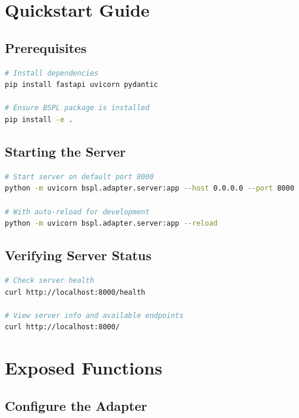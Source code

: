 \documentclass[11pt,a4paper]{article}
\begin{document}
\section{Quickstart Guide}

\subsection{Prerequisites}

\begin{lstlisting}[language=bash]
# Install dependencies
pip install fastapi uvicorn pydantic

# Ensure BSPL package is installed
pip install -e .
\end{lstlisting}

\subsection{Starting the Server}

\begin{lstlisting}[language=bash]
# Start server on default port 8000
python -m uvicorn bspl.adapter.server:app --host 0.0.0.0 --port 8000

# With auto-reload for development
python -m uvicorn bspl.adapter.server:app --reload
\end{lstlisting}

\subsection{Verifying Server Status}

\begin{lstlisting}[language=bash]
# Check server health
curl http://localhost:8000/health

# View server info and available endpoints
curl http://localhost:8000/
\end{lstlisting}

\section{Exposed Functions}

\subsection{Configure the Adapter}
\end{document}
